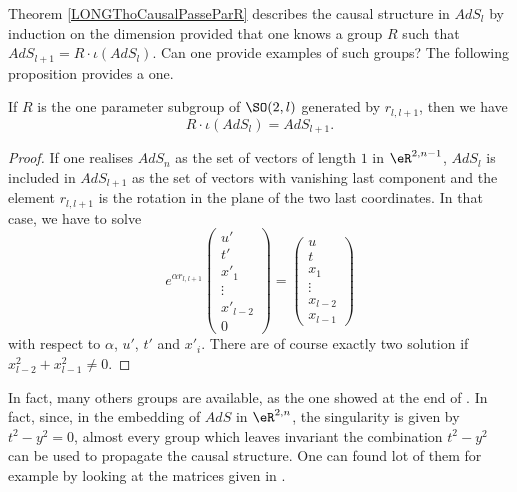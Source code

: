 Theorem \ref{LONGThoCausalPasseParR} describes the causal structure in $AdS_l$ by induction on the dimension provided that one knows a group $R$ such that $AdS_{l+1}=R\cdot \iota(AdS_l)$. Can one provide examples of such groups? The following proposition provides a one.

\begin{proposition}		\label{LONGPropSurjectif}
	If $R$ is the one parameter subgroup of $\SO(2,l)$ generated by $r_{l,l+1}$, then we have
	\begin{equation}
		R\cdot \iota(AdS_l)= AdS_{l+1}.
	\end{equation}
\end{proposition}

%
%
%
%
%
%
%
%
%
%
%
%
%
%
%
%
%
%
%
%
%
%
%
%
%
%
%
%
%
%
%
%
%
%
%
%
%
%
%
%
%
%
%
%

\begin{proof}
	If one realises $AdS_n$ as the set of vectors of length $1$ in $\eR^{2,n-1}$, $AdS_l$ is included in $AdS_{l+1}$ as the set of vectors with vanishing last component and the element $r_{l,l+1}$ is the rotation in the plane of the two last coordinates. In that case, we have to solve
	\begin{equation}
		e^{\alpha r_{l,l+1}}\begin{pmatrix}
			u'	\\ 
			t'	\\ 
			x'_1	\\ 
			\vdots	\\ 
			x'_{l-2}	\\ 
			0	
		\end{pmatrix}=
		\begin{pmatrix}
			u	\\ 
			t	\\ 
			x_1	\\ 
			\vdots	\\ 
			x_{l-2}	\\ 
			x_{l-1}	
		\end{pmatrix}
	\end{equation}
	with respect to $\alpha$, $u'$, $t'$ and $x'_i$. There are of course exactly two solution if $x_{l-2}^2+x_{l-1}^2\neq 0$.
\end{proof}

In fact, many others groups are available, as the one showed at the end of \cite{BTZ_horizon}. In fact, since, in the embedding of $AdS$ in $\eR^{2,n}$, the singularity is given by $t^2-y^2=0$, almost every group which leaves invariant the combination $t^2-y^2$ can be used to propagate the causal structure. One can found lot of them for example by looking at the matrices given in \cite{These}.

